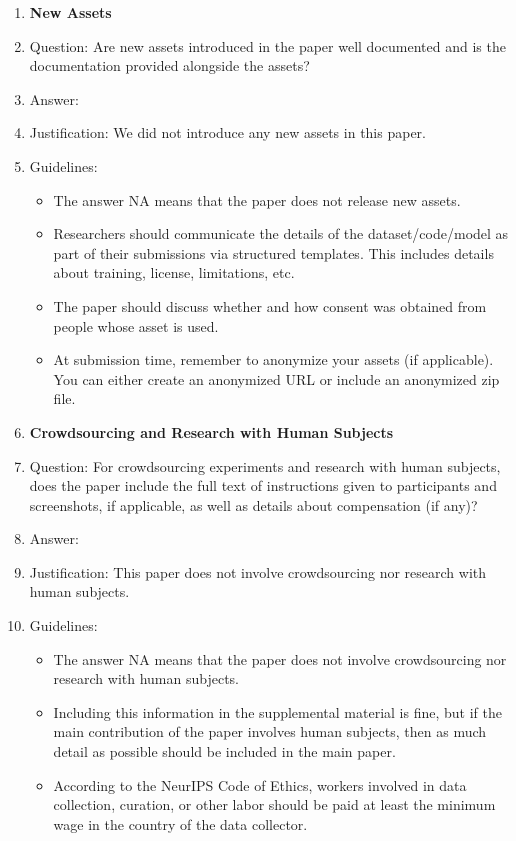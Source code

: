 \documentclass[11pt]{article}
\theoremstyle{plain}
\theoremstyle{definition}
\theoremstyle{remark}
\renewcommand{\^}[1]{^{(#1)}}
\begin{document}
\begin{enumerate}
\item {\bf New Assets}
    \item[] Question: Are new assets introduced in the paper well documented and is the documentation provided alongside the assets?
    \item[] Answer: \answerNA{} 
    \item[] Justification: We did not introduce any new assets in this paper. 
    \item[] Guidelines:
    \begin{itemize}
        \item The answer NA means that the paper does not release new assets.
        \item Researchers should communicate the details of the dataset/code/model as part of their submissions via structured templates. This includes details about training, license, limitations, etc. 
        \item The paper should discuss whether and how consent was obtained from people whose asset is used.
        \item At submission time, remember to anonymize your assets (if applicable). You can either create an anonymized URL or include an anonymized zip file.
    \end{itemize}

\item {\bf Crowdsourcing and Research with Human Subjects}
    \item[] Question: For crowdsourcing experiments and research with human subjects, does the paper include the full text of instructions given to participants and screenshots, if applicable, as well as details about compensation (if any)? 
    \item[] Answer: \answerNA{} 
    \item[] Justification: This paper does not involve crowdsourcing nor research with human subjects.
    \item[] Guidelines:
    \begin{itemize}
        \item The answer NA means that the paper does not involve crowdsourcing nor research with human subjects.
        \item Including this information in the supplemental material is fine, but if the main contribution of the paper involves human subjects, then as much detail as possible should be included in the main paper. 
        \item According to the NeurIPS Code of Ethics, workers involved in data collection, curation, or other labor should be paid at least the minimum wage in the country of the data collector. 
    \end{itemize}


\end{enumerate}
\end{document}
